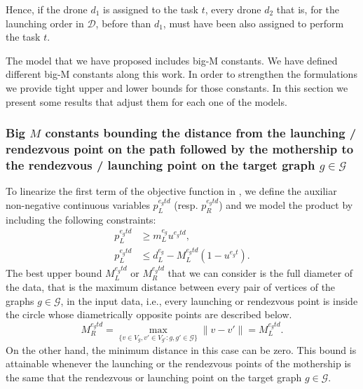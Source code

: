\noindent
Hence, if the drone $d_1$ is assigned to the task $t$, every drone $d_2$ that is, for the launching order in $\mathcal D$, before than $d_1$, must have been also assigned to perform the task $t$.
\medskip

\noindent
The model that we have proposed includes big-M constants. We have defined different big-M constants along this work. In order to strengthen the formulations we provide tight upper and lower bounds for those constants. In this section we present some results that adjust them for each one of the models.

\subsubsection*{Big $M$ constants bounding the distance from the launching / rendezvous point on the path followed by the mothership to the rendezvous / launching point on the target graph $g\in \mathcal{G}$}

\noindent
To linearize the first term of the objective function in \AMD, we define the auxiliar non-negative continuous variables $p_L^{e_gtd}$ (resp. $p_R^{e_gtd}$) and we model the product by including the following constraints:
\begin{align*}
p_L^{e_gtd} & \geq m_L^{e_g} u^{e_gtd}, \\
p_L^{e_gtd} & \leq d_L^{e_g} - M_L^{e_gtd}(1-u^{e_gt}).
\end{align*}
The best upper bound $M_L^{e_gtd}$ or $M_R^{e_gtd}$ that we can consider is the full diameter of the data, that is the maximum distance between every pair of vertices of the graphs $g\in \mathcal{G}$, in the input data, i.e., every launching or rendezvous point is inside the circle whose diametrically opposite points are described below. 
$$
M_R^{e_gtd} = \max_{\{v\in V_g, v'\in V_{g'} : g, g'\in\mathcal G\}} \|v - v'\| = M_L^{e_gtd}.
$$
\noindent
On the other hand, the minimum distance in this case can be zero. This bound is attainable whenever the launching or the rendezvous points of the mothership is the same that the rendezvous or launching point on the target graph $g\in \mathcal{G}$.


